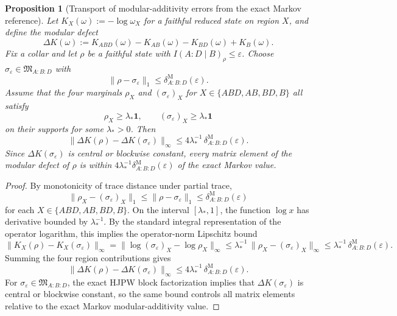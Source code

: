 \documentclass[11pt]{article}
\newtheorem{proposition}[theorem]{Proposition}
\begin{document}
\begin{proposition}[Transport of modular-additivity errors from the exact Markov reference]\label{prop:modulartransport}
Let \(K_X(\omega):=-\log \omega_X\) for a faithful reduced state on region \(X\), and define the modular defect
\[
\Delta K(\omega):=
K_{ABD}(\omega)-K_{AB}(\omega)-K_{BD}(\omega)+K_B(\omega).
\]
Fix a collar and let \(\rho\) be a faithful state with \(I(A:D\mid B)_\rho\le \varepsilon\). Choose \(\sigma_\varepsilon\in \mathfrak M_{A:B:D}\) with
\[
\|\rho-\sigma_\varepsilon\|_1\le \delta^{\mathrm M}_{A:B:D}(\varepsilon).
\]
Assume that the four marginals \(\rho_X\) and \((\sigma_\varepsilon)_X\) for \(X\in\{ABD,AB,BD,B\}\) all satisfy
\[
\rho_X\ge \lambda_\ast \mathbf 1,
\qquad
(\sigma_\varepsilon)_X\ge \lambda_\ast \mathbf 1
\]
on their supports for some \(\lambda_\ast>0\). Then
\[
\|\Delta K(\rho)-\Delta K(\sigma_\varepsilon)\|_\infty
\le
4\lambda_\ast^{-1}\,\delta^{\mathrm M}_{A:B:D}(\varepsilon).
\]
Since \(\Delta K(\sigma_\varepsilon)\) is central or blockwise constant, every matrix element of the modular defect of \(\rho\) is within \(4\lambda_\ast^{-1}\delta^{\mathrm M}_{A:B:D}(\varepsilon)\) of the exact Markov value.
\end{proposition}

\begin{proof}
By monotonicity of trace distance under partial trace,
\[
\|\rho_X-(\sigma_\varepsilon)_X\|_1
\le
\|\rho-\sigma_\varepsilon\|_1
\le
\delta^{\mathrm M}_{A:B:D}(\varepsilon)
\]
for each \(X\in\{ABD,AB,BD,B\}\). On the interval \([\lambda_\ast,1]\), the function \(\log x\) has derivative bounded by \(\lambda_\ast^{-1}\). By the standard integral representation of the operator logarithm, this implies the operator-norm Lipschitz bound
\[
\|K_X(\rho)-K_X(\sigma_\varepsilon)\|_\infty
=
\|\log (\sigma_\varepsilon)_X-\log \rho_X\|_\infty
\le
\lambda_\ast^{-1}\,\|\rho_X-(\sigma_\varepsilon)_X\|_\infty
\le
\lambda_\ast^{-1}\,\delta^{\mathrm M}_{A:B:D}(\varepsilon).
\]
Summing the four region contributions gives
\[
\|\Delta K(\rho)-\Delta K(\sigma_\varepsilon)\|_\infty
\le
4\lambda_\ast^{-1}\,\delta^{\mathrm M}_{A:B:D}(\varepsilon).
\]
For \(\sigma_\varepsilon\in \mathfrak M_{A:B:D}\), the exact HJPW block factorization implies that \(\Delta K(\sigma_\varepsilon)\) is central or blockwise constant, so the same bound controls all matrix elements relative to the exact Markov modular-additivity value.
\end{proof}
\end{document}
